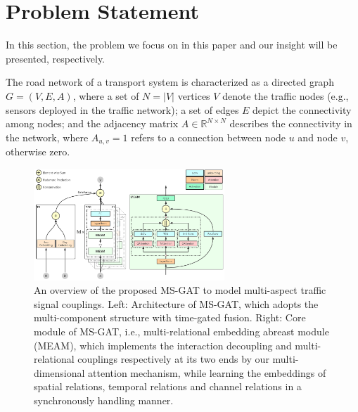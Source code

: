 \section{Problem Statement}
\label{sec:problem_statement}

In this section, the problem we focus on in this paper and our insight will be presented, respectively. 

The road network of a transport system is characterized as a directed graph $G = (V, E, A)$, where a set of $N = |V|$ vertices $V$ denote the traffic nodes (e.g., sensors deployed in the traffic network); a set of edges $E$ depict the connectivity among nodes; and the adjacency matrix $A \in \mathbb{R}^{N \times N}$ describes the connectivity in the network, where $A_{u,v}=1$ refers to a connection between node $u$ and node $v$, otherwise zero.

\begin{figure}[!ht]
    \centering
    \includegraphics[width=0.64\textwidth]{pictures/Framework.png}
    \caption{An overview of the proposed MS-GAT to model multi-aspect traffic signal couplings. Left: Architecture of MS-GAT, which adopts the multi-component structure with time-gated fusion. Right: Core module of MS-GAT, i.e., multi-relational embedding abreast module (MEAM), which implements the interaction decoupling and multi-relational couplings respectively at its two ends by our multi-dimensional attention mechanism, while learning the embeddings of spatial relations, temporal relations and channel relations in a synchronously handling manner.}
    \label{fig:framework}
\end{figure}

